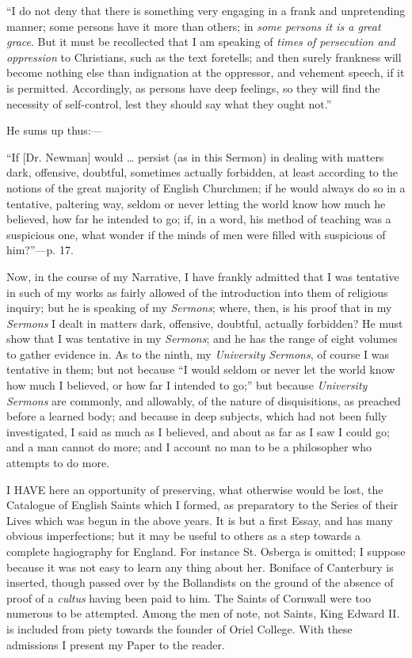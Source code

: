 ``I do not
deny that there is
something very engaging in a frank and unpretending manner; some persons
have it more than others; in \emph{some persons it is a great grace}.
But it must be recollected that I am speaking of \emph{times of persecution
and oppression} to Christians, such as the text foretells; and then
surely frankness will become nothing else than indignation at the
oppressor, and vehement speech, if it is permitted. Accordingly, as
persons have deep feelings, so they will find the necessity of self-control, lest they
should say what they ought not.''

He sums up thus:—

``If [Dr. Newman] would … persist (as in this Sermon) in dealing with matters
dark, offensive, doubtful, sometimes actually forbidden, at least
according to the notions of the great majority of English Churchmen; if
he would always do so in a tentative, paltering way, seldom or never
letting the world know how much he believed, how far he intended to go;
if, in a word, his method of teaching was a suspicious one, what
wonder if the minds of men were filled with suspicious of him?''—p. 17.

Now, in the course of my Narrative, I have frankly
admitted that I was tentative in such of my works as fairly allowed of
the introduction into them of religious inquiry; but he is speaking
of my \emph{Sermons}; where, then, is his proof that in my \emph{Sermons} I dealt in
matters dark, offensive, doubtful, actually forbidden? He must show that I was
tentative in my \emph{Sermons}; and he has the range of eight volumes
to gather evidence in. As to
the ninth, my \emph{University Sermons}, of course I was tentative in them; but not because ``I would seldom or never
let the world know how much I believed, or how far I intended to
go;'' but because \emph{University Sermons} are commonly, and
allowably, of the nature of disquisitions, as preached before a learned
body; and because in deep subjects, which had not been fully
investigated, I said as much as I believed, and about as far as I saw I
could go; and a man cannot do more; and I account no man to be a
philosopher who attempts to do more.


I HAVE
here an opportunity of preserving, what otherwise would be lost, the
Catalogue of English Saints which I formed, as preparatory to the Series
of their Lives which was begun in the above years. It is but a first
Essay, and has many obvious imperfections; but it may be useful to
others as a step towards a complete hagiography for England. For
instance St. Osberga is omitted; I suppose because it was not easy to
learn any thing about her. Boniface of Canterbury is inserted, though
passed over by the Bollandists on the ground of the absence of proof of
a \emph{cultus}
having been paid to him. The Saints of Cornwall were too numerous
to be attempted. Among the men of note, not Saints, King Edward II. is
included from piety towards the founder of Oriel College. With these
admissions I present my Paper to the reader.

